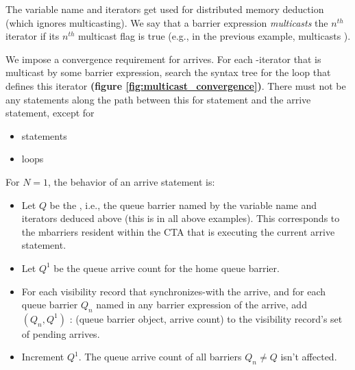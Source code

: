 The variable name and  iterators get used for distributed memory deduction (which ignores multicasting).
We say that a barrier expression \textit{multicasts} the $n^{th}$ iterator if its $n^{th}$ multicast flag is true (e.g., in the previous example,  multicasts ).

\begin{figure*}[!b]

\caption{Illustration of mbarrier multicast convergence requirements} \label{fig:multicast_convergence}
\end{figure*}

\filbreak
{}

We impose a convergence requirement for arrives.
For each -iterator that is multicast by some barrier expression, search the syntax tree for the  loop that defines this iterator \textbf{(figure \ref{fig:multicast_convergence})}.
There must not be any statements along the path between this for statement and the arrive statement, except for
\begin{itemize}
  \item {} statements
  \filbreak
  \item {} loops
\end{itemize}

\filbreak
For $N=1$, the behavior of an arrive statement is:
\begin{itemize}
  \item Let $Q$ be the , i.e., the queue barrier named by the variable name and iterators deduced above (this is  in all above examples).
    This corresponds to the mbarriers resident within the CTA that is executing the current arrive statement.
  \filbreak
  \item Let $Q^1$ be the queue arrive count for the home queue barrier.
  \filbreak
  \item For each visibility record that synchronizes-with the arrive, and for each queue barrier $Q_n$ named in any barrier expression of the arrive, add $(Q_n, Q^1)$ : (queue barrier object, arrive count) to the visibility record's set of pending arrives.
  \filbreak
  \item Increment $Q^1$.
    The queue arrive count of all barriers $Q_n \ne Q$ isn't affected.
\end{itemize}

